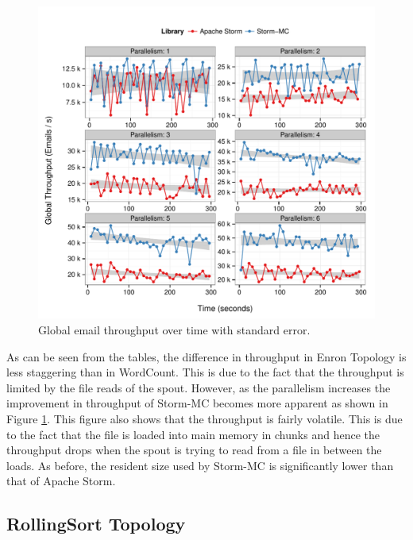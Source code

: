 \documentclass[bsc,deptreport,twoside,singlespacing,normalheadings,parskip]{infthesis}\usepackage[]{graphicx}\usepackage[]{color}
\makeatletter
\def\maxwidth{ %
  \ifdim\Gin@nat@width>\linewidth
    \linewidth
  \else
    \Gin@nat@width
  \fi
}
\newenvironment{knitrout}{}{} %
\makeatother
\begin{document}
\begin{knitrout}
\color{fgcolor}\begin{figure}[!htb]

{\centering \includegraphics[width=\maxwidth]{figure/enron-plot-1} 

}

\caption[Global email throughput over time with standard error]{Global email throughput over time with standard error.}\label{fig:enron-plot}
\end{figure}


\end{knitrout}

As can be seen from the tables, the difference in throughput in Enron Topology is less staggering than in WordCount. This is due to the fact that the throughput is limited by the file reads of the spout. However, as the parallelism increases the improvement in throughput of Storm-MC becomes more apparent as shown in Figure \ref{fig:enron-plot}. This figure also shows that the throughput is fairly volatile. This is due to the fact that the file is loaded into main memory in chunks and hence the throughput drops when the spout is trying to read from a file in between the loads. As before, the resident size used by Storm-MC is significantly lower than that of Apache Storm.

\subsection{RollingSort Topology}
\end{document}
